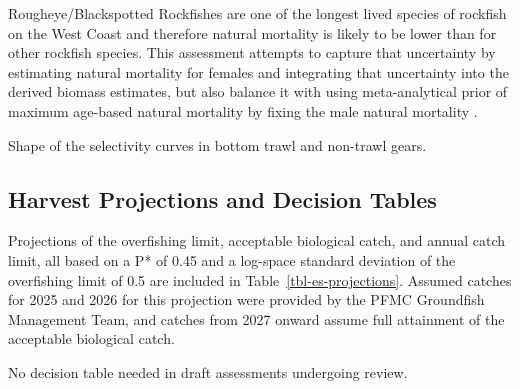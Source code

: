 \documentclass[
]{scrartcl}
\begin{document}
Rougheye/Blackspotted Rockfishes are one of the longest lived species of
rockfish on the West Coast and therefore natural mortality is likely to
be lower than for other rockfish species. This assessment attempts to
capture that uncertainty by estimating natural mortality for females and
integrating that uncertainty into the derived biomass estimates, but
also balance it with using meta-analytical prior of maximum age-based
natural mortality by fixing the male natural mortality .

Shape of the selectivity curves in bottom trawl and non-trawl gears.

\subsection{Harvest Projections and Decision
Tables}\label{harvest-projections-and-decision-tables}

Projections of the overfishing limit, acceptable biological catch, and
annual catch limit, all based on a P* of 0.45 and a log-space standard
deviation of the overfishing limit of 0.5 are included in
Table~\ref{tbl-es-projections}. Assumed catches for 2025 and 2026 for
this projection were provided by the PFMC Groundfish Management Team,
and catches from 2027 onward assume full attainment of the acceptable
biological catch.

No decision table needed in draft assessments undergoing review.
\end{document}
